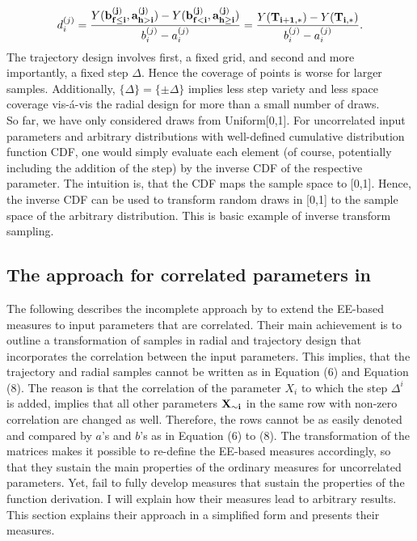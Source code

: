 \documentclass[a4paper,12pt]{article}
\begin{document}
\begin{align}
d^{(j)}_i =  \frac{Y(\bold{b_{f \leq i}^{(j)}}, \bold{a_{h>i}^{(j)}}) - Y(\bold{b_{f<i}^{(j)}}, \bold{a_{h \geq i}^{(j)}})}{b_i^{(j)} - a_i^{(j)}} = \frac{Y(\bold{T_{i+1,*})} -  Y(\bold{T_{i,*}})}{b_i^{(j)} - a_i^{(j)}}.
\end{align}
The trajectory design involves first, a fixed grid, and second and more importantly, a fixed step $\Delta$. Hence the coverage of points is worse for larger samples. Additionally, $\{\Delta\} = \{\pm \Delta\}$ implies less step variety and less space coverage vis-á-vis the radial design for more than a small number of draws.\\

\noindent
So far, we have only considered draws from Uniform[0,1]. For uncorrelated input parameters and arbitrary distributions with well-defined cumulative distribution function CDF, one would simply evaluate each element (of course, potentially including the addition of the step) by the inverse CDF of the respective parameter. The intuition is, that the CDF maps the sample space to [0,1]. Hence, the inverse CDF can be used to transform random draws in [0,1] to the sample space of the arbitrary distribution. This is basic example of inverse transform sampling.



\subsection{The approach for correlated parameters in \cite{ge2017extending}}

The following describes the incomplete approach by \cite{ge2017extending} to extend the EE-based measures to input parameters that are correlated. Their main achievement is to outline a transformation of samples in radial and trajectory design that incorporates the correlation between the input parameters. This implies, that the trajectory and radial samples cannot be written as in Equation (6) and Equation (8). The reason is that the correlation of the parameter $X_i$ to which the step $\Delta^i$ is added, implies that all other parameters $\bold{X_{\sim i}}$ in the same row with non-zero correlation are changed as well. Therefore, the rows cannot be as easily denoted and compared by $a$'s and $b$'s as in Equation (6) to (8). The transformation of the matrices makes it possible to re-define the EE-based measures accordingly, so that they sustain the main properties of the ordinary measures for uncorrelated parameters. Yet, \cite{ge2017extending} fail to fully develop measures that sustain the properties of the function derivation. I will explain how their measures lead to arbitrary results. This section explains their approach in a simplified form and presents their measures.\\
\end{document}
